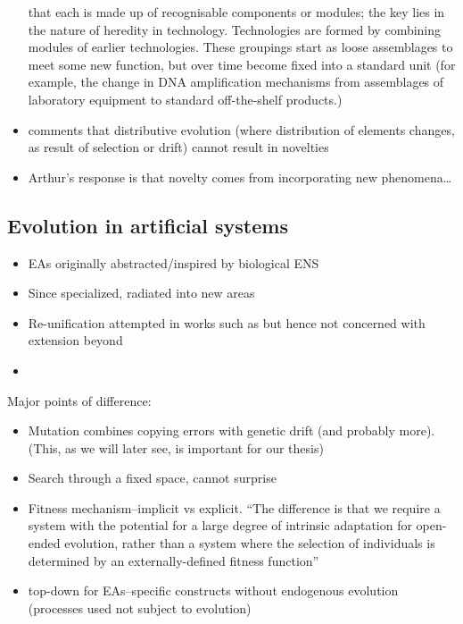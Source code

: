 \begin{itemize}
	that each is made up of recognisable components or modules; the key
	lies in the nature of heredity in technology. Technologies are
	formed by combining modules of earlier technologies. These groupings
	start as loose assemblages to meet some new function, but over time
	become fixed into a standard unit (for example, the change in DNA
	amplification mechanisms from assemblages of laboratory equipment to
	standard off-the-shelf products.)
	\item
	\autocite{Bourrat2015} comments that distributive evolution (where
	distribution of elements changes, as result of selection or drift)
	cannot result in novelties
	\item
	Arthur's response is that novelty comes from incorporating new
	phenomena\ldots{}
\end{itemize}

\subsection{Evolution in artificial systems}

\begin{itemize}
	\item
	EAs originally abstracted/inspired by biological ENS
	\item
	Since specialized, radiated into new areas
	\item
	Re-unification attempted in works such as \autocite{Paixao2015} but hence not concerned with extension beyond 
	\item
\end{itemize}

Major points of difference:

\begin{itemize}
	\item
	Mutation combines copying errors with genetic drift (and probably more). (This, as we will later see, is important for our thesis)
	\item
	Search through a fixed space, cannot surprise \eg \autocite{Nellis2014}
	\item
	Fitness mechanism--implicit vs explicit.  ``The
	difference is that we require a system with the potential for a
	large degree of intrinsic adaptation for open-ended evolution,
	rather than a system where the selection of individuals is
	determined by an externally-defined fitness function'' \autocite{Taylor2001}
	\item
	top-down for EAs--specific constructs without endogenous evolution (processes used not subject to evolution)
\end{itemize}

